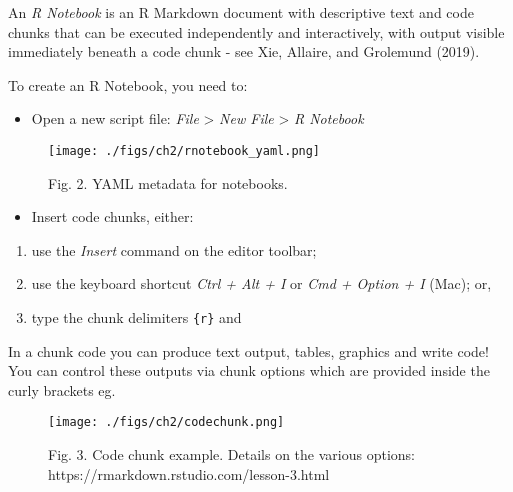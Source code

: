 \documentclass[
  letterpaper,
  krantz2]{style/krantz}
\providecommand{\tightlist}{%
  \setlength{\itemsep}{0pt}\setlength{\parskip}{0pt}}\usepackage{longtable,booktabs,array}
\begin{document}
An \emph{R Notebook} is an R Markdown document with descriptive text and
code chunks that can be executed independently and interactively, with
output visible immediately beneath a code chunk - see Xie, Allaire, and
Grolemund (2019).

To create an R Notebook, you need to:

\begin{itemize}
\tightlist
\item
  Open a new script file: \emph{File} \textgreater{} \emph{New File}
  \textgreater{} \emph{R Notebook}
\end{itemize}

\begin{figure}

{\centering \texttt{[image: ./figs/ch2/rnotebook\_yaml.png]}

}

\caption{Fig. 2. YAML metadata for notebooks.}

\end{figure}

\begin{itemize}
\tightlist
\item
  Insert code chunks, either:
\end{itemize}

\begin{enumerate}
\def\labelenumi{\arabic{enumi})}
\tightlist
\item
  use the \emph{Insert} command on the editor toolbar;
\item
  use the keyboard shortcut \emph{Ctrl + Alt + I} or \emph{Cmd + Option
  + I} (Mac); or,
\item
  type the chunk delimiters
  \texttt{\textasciigrave{}\textasciigrave{}\textasciigrave{}\{r\}} and
  \texttt{\textasciigrave{}\textasciigrave{}\textasciigrave{}}
\end{enumerate}

In a chunk code you can produce text output, tables, graphics and write
code! You can control these outputs via chunk options which are provided
inside the curly brackets eg.

\begin{figure}

{\centering \texttt{[image: ./figs/ch2/codechunk.png]}

}

\caption{Fig. 3. Code chunk example. Details on the various options:
https://rmarkdown.rstudio.com/lesson-3.html}

\end{figure}
\end{document}
